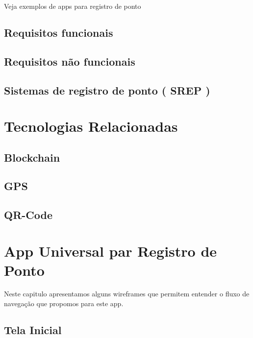 \documentclass[12pt,openright,twoside,a4paper,english, brazil]{abntex2} %
\begin{document}
Veja exemplos de apps para registro de ponto

\section{Requisitos funcionais}

\section{Requisitos não funcionais}

\section{Sistemas de registro de ponto ( SREP )}









\chapter{Tecnologias Relacionadas}

\section{Blockchain}

\section{GPS}

\section{QR-Code}






\chapter{App Universal par Registro de Ponto}

Neste capitulo apresentamos alguns wireframes que permitem entender o fluxo de navegação que propomos para este app.

\section{Tela Inicial}
\end{document}
